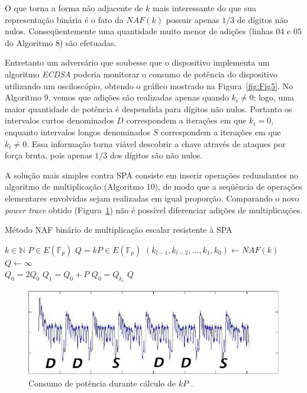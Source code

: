 O que torna a forma n\~{a}o adjacente de $k$ mais interessante do que sua representa\c{c}\~{a}o bin\'{a}ria \'{e} o fato da $NAF(k)$ possuir apenas $1/3$ de d\'{i}gitos n\~{a}o nulos. Conseq\"{u}entemente uma quantidade muito menor de adi\c{c}\~{o}es (linhas $04$ e $05$ do Algoritmo 8) s\~{a}o efetuadas.

Entretanto um advers\'{a}rio que soubesse que o dispositivo implementa um algoritmo \textit{ECDSA} poderia monitorar o consumo de pot\^{e}ncia do dispositivo utilizando um oscilosc\'{o}pio, obtendo o gr\'{a}fico mostrado na Figura~\ref{fig:Fig5}. No Algoritmo 9, vemos que adi\c{c}\~{o}es s\~{a}o realizadas apenas quando $k_{i} \neq 0$; logo, uma maior quantidade de pot\^{e}ncia \'{e} despendida para d\'{i}gitos n\~{a}o nulos. Portanto os intervalos curtos denominados $D$ correspondem a itera\c{c}\~{o}es em que $k_{i} = 0$, enquanto intervalos longos denominados $S$ correspondem a itera\c{c}\~{o}es em que $k_{i} \neq 0$. Essa informa\c{c}\~{a}o torna vi\'{a}vel descobrir a chave atrav\'{e}s de ataques por for\c{c}a bruta, pois apenas $1/3$ dos d\'{i}gitos s\~{a}o n\~{a}o nulos.

A solu\c{c}\~{a}o mais simples contra SPA consiste em inserir opera\c{c}\~{o}es redundantes no algoritmo de multiplica\c{c}\~{a}o (Algoritmo 10), de modo que a seq\"{u}\^{e}ncia de opera\c{c}\~{o}es elementares envolvidas sejam realizadas em igual propor\c{c}\~{a}o. Comparando o novo \textit{power trace} obtido (Figura~\ref{fig:Fig7}) n\~{a}o \'{e} poss\'{i}vel diferenciar adi\c{c}\~{o}es de multiplica\c{c}\~{o}es.

\begin{algorithm}[H]
\caption{M\'{e}todo NAF bin\'{a}rio de multiplica\c{c}\~{a}o escalar resistente \`{a} SPA}
\begin{algorithmic}
    \REQUIRE $k \in \mathbb{N}$
    \REQUIRE $P \in E(\mathbb{F}_p)$
    \ENSURE $Q = kP \in E(\mathbb{F}_p)$
    \STATE $(k_{l-1}, k_{l-2}, ..., k_{1}, k_{0}) \leftarrow NAF(k)$
    \STATE $Q \leftarrow \infty$\\
        \STATE $Q_{0} = 2Q_{0}$
        \STATE $Q_{1} = Q_{0} + P$
        \STATE $Q_{0} = Q_{k_{i}}$
    \ENDFOR
    \RETURN $Q$
    \end{algorithmic}
\end{algorithm}

\begin{figure}[ht]
	\centering
	\includegraphics[width=.8\textwidth]{figures/spa2.jpg}
	\caption{Consumo de pot\^{e}ncia durante c\'{a}lculo de $kP$ \cite{ECCBook_HankersonVanstone2004}.}
	\label{fig:Fig7}
\end{figure}


